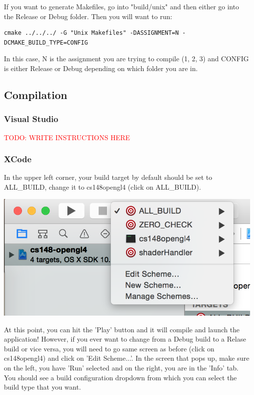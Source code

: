 \documentclass{article}
\begin{document}
If you want to generate Makefiles, go into "build/unix" and then either go into the Release or Debug folder. Then you will want to run:

\begin{lstlisting}
cmake ../../../ -G "Unix Makefiles" -DASSIGNMENT=N -DCMAKE_BUILD_TYPE=CONFIG
\end{lstlisting}

In this case, N is the assignment you are trying to compile (1, 2, 3) and CONFIG is either Release or Debug depending on which folder you are in.

\subsection*{Compilation}

\subsubsection*{Visual Studio}

\textcolor{red}{TODO: WRITE INSTRUCTIONS HERE}

\subsubsection*{XCode}

In the upper left corner, your build target by default should be set to ALL\_BUILD, change it to cs148opengl4 (click on ALL\_BUILD).

\includegraphics[]{xcode1.png}

At this point, you can hit the 'Play' button and it will compile and launch the application! However, if you ever want to change from a Debug build to a Relase build or vice versa, you will need to go same screen as before (click on cs148opengl4) and click on 'Edit Scheme...'. In the screen that pops up, make sure on the left, you have 'Run' selected and on the right, you are in the 'Info' tab. You should see a build configuration dropdown from which you can select the build type that you want.
\end{document}
